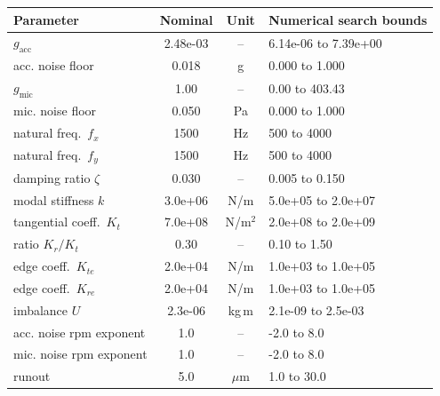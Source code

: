 \begin{tabular}{lccl}
\toprule
Parameter & Nominal & Unit & Numerical search bounds \\
\midrule
$g_{\mathrm{acc}}$ & 2.48e-03 & -- & 6.14e-06 to 7.39e+00 \\
acc. noise floor & 0.018 & g & 0.000 to 1.000 \\
$g_{\mathrm{mic}}$ & 1.00 & -- & 0.00 to 403.43 \\
mic. noise floor & 0.050 & Pa & 0.000 to 1.000 \\
natural freq.\ $f_x$ & 1500 & Hz & 500 to 4000 \\
natural freq.\ $f_y$ & 1500 & Hz & 500 to 4000 \\
damping ratio $\zeta$ & 0.030 & -- & 0.005 to 0.150 \\
modal stiffness $k$ & 3.0e+06 & N/m & 5.0e+05 to 2.0e+07 \\
tangential coeff.\ $K_t$ & 7.0e+08 & N/m$^2$ & 2.0e+08 to 2.0e+09 \\
ratio $K_r/K_t$ & 0.30 & -- & 0.10 to 1.50 \\
edge coeff.\ $K_{te}$ & 2.0e+04 & N/m & 1.0e+03 to 1.0e+05 \\
edge coeff.\ $K_{re}$ & 2.0e+04 & N/m & 1.0e+03 to 1.0e+05 \\
imbalance $U$ & 2.3e-06 & kg\,m & 2.1e-09 to 2.5e-03 \\
acc. noise rpm exponent & 1.0 & -- & -2.0 to 8.0 \\
mic. noise rpm exponent & 1.0 & -- & -2.0 to 8.0 \\
runout & 5.0 & $\mu$m & 1.0 to 30.0 \\
\bottomrule
\end{tabular}
